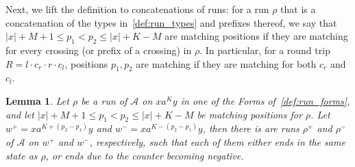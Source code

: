 \documentclass[11pt,a4paper]{amsart}
\newtheorem{lemma}[theorem]{Lemma}
\theoremstyle{definition}
\newcommand{\cA}{\mathcal{A}}
\begin{document}
Next, we lift the definition to concatenations of runs: for a run $\rho$ that is a
concatenation of the types in~\cref{def:run_types} and prefixes thereof, we say
that $|x|+M+1 \leq p_1<p_2 \leq |x|+K-M$ are matching positions if they are matching
for every crossing (or prefix of a crossing) in $\rho$.  In particular, for a round
trip $R=l\cdot c_r\cdot r\cdot c_l$, positions $p_1,p_2$ are matching if they are matching
for both $c_r$ and $c_l$.


\begin{lemma}
\label{lem:matching_positions_are_pumpable} Let $\rho$ be a run of $\cA$ on
$xa^Ky$ in one of the Forms of~\cref{def:run_forms}, and let $|x|+M+1\le
p_1<p_2\le |x|+K-M$ be matching positions for $\rho$. Let $w^+=xa^{K+(p_2-p_1)}y$
and $w^-=xa^{K-(p_2-p_1)}y$, then there is are runs $\rho^+$ and $\rho^-$ of $\cA$
on $w^+$ and $w^-$, respectively, such that each of them either ends in the
same state as $\rho$, or ends due to the counter becoming negative.
\end{lemma}
\end{document}
